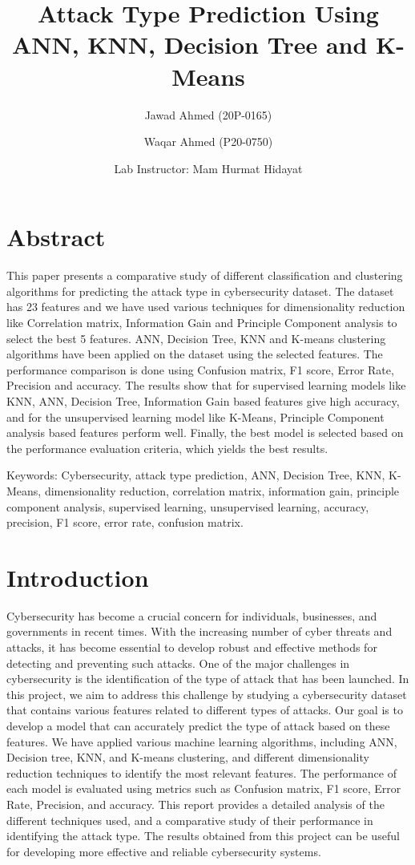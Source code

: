 \documentclass{article}
\begin{document}
\title{Attack Type Prediction Using ANN, KNN, Decision Tree and K-Means}
\author{Jawad Ahmed (20P-0165) \and Waqar Ahmed (P20-0750)}
\date{Lab Instructor: Mam Hurmat Hidayat}
\maketitle

\section{Abstract}
This paper presents a comparative study of different classification and clustering algorithms for predicting the attack type in cybersecurity dataset. The dataset has 23 features and we have used various techniques for dimensionality reduction like Correlation matrix, Information Gain and Principle Component analysis to select the best 5 features. ANN, Decision Tree, KNN and K-means clustering algorithms have been applied on the dataset using the selected features. The performance comparison is done using Confusion matrix, F1 score, Error Rate, Precision and accuracy. The results show that for supervised learning models like KNN, ANN, Decision Tree, Information Gain based features give high accuracy, and for the unsupervised learning model like K-Means, Principle Component analysis based features perform well. Finally, the best model is selected based on the performance evaluation criteria, which yields the best results.
\

Keywords: Cybersecurity, attack type prediction, ANN, Decision Tree, KNN, K-Means, dimensionality reduction, correlation matrix, information gain, principle component analysis, supervised learning, unsupervised learning, accuracy, precision, F1 score, error rate, confusion matrix.

\section{Introduction}
Cybersecurity has become a crucial concern for individuals, businesses, and governments in recent times. With the increasing number of cyber threats and attacks, it has become essential to develop robust and effective methods for detecting and preventing such attacks. One of the major challenges in cybersecurity is the identification of the type of attack that has been launched. In this project, we aim to address this challenge by studying a cybersecurity dataset that contains various features related to different types of attacks. Our goal is to develop a model that can accurately predict the type of attack based on these features. We have applied various machine learning algorithms, including ANN, Decision tree, KNN, and K-means clustering, and different dimensionality reduction techniques to identify the most relevant features. The performance of each model is evaluated using metrics such as Confusion matrix, F1 score, Error Rate, Precision, and accuracy. This report provides a detailed analysis of the different techniques used, and a comparative study of their performance in identifying the attack type. The results obtained from this project can be useful for developing more effective and reliable cybersecurity systems.
\end{document}
